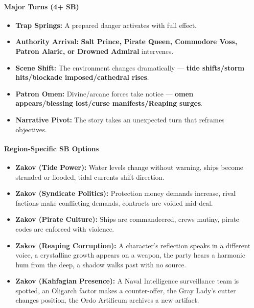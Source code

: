 \paragraph{Major Turns (4+ SB)}
\begin{itemize}
\item \textbf{Trap Springs:} A prepared danger activates with full effect.
\item \textbf{Authority Arrival:} \textbf{Salt Prince, Pirate Queen, Commodore Voss, Patron Alaric, or Drowned Admiral} intervenes.
\item \textbf{Scene Shift:} The environment changes dramatically --- \textbf{tide shifts/storm hits/blockade imposed/cathedral rises}.
\item \textbf{Patron Omen:} Divine/arcane forces take notice --- \textbf{omen appears/blessing lost/curse manifests/Reaping surges}.
\item \textbf{Narrative Pivot:} The story takes an unexpected turn that reframes objectives.
\end{itemize}

\paragraph{Region-Specific SB Options}
\begin{itemize}
\item \textbf{Zakov (Tide Power):} Water levels change without warning, ships become stranded or flooded, tidal currents shift direction.
\item \textbf{Zakov (Syndicate Politics):} Protection money demands increase, rival factions make conflicting demands, contracts are voided mid-deal.
\item \textbf{Zakov (Pirate Culture):} Ships are commandeered, crews mutiny, pirate codes are enforced with violence.
\item \textbf{Zakov (Reaping Corruption):} A character's reflection speaks in a different voice, a crystalline growth appears on a weapon, the party hears a harmonic hum from the deep, a shadow walks past with no source.
\item \textbf{Zakov (Kahfagian Presence):} A Naval Intelligence surveillance team is spotted, an Oligarch factor makes a counter-offer, the Gray Lady's cutter changes position, the Ordo Artificum archives a new artifact.
\end{itemize}

